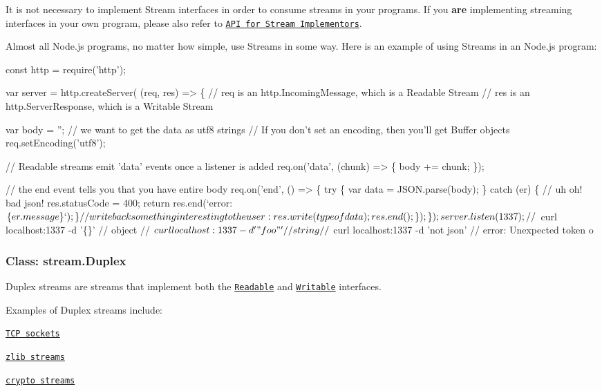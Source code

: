 It is not necessary to implement Stream interfaces in order to consume streams in your programs. If you {\bfseries are} implementing streaming interfaces in your own program, please also refer to \href{#stream_api_for_stream_implementors}{\tt A\+PI for Stream Implementors}.

Almost all Node.\+js programs, no matter how simple, use Streams in some way. Here is an example of using Streams in an Node.\+js program\+:


\begin{DoxyCode}
const http = require('http');

var server = http.createServer( (req, res) => \{
  // req is an http.IncomingMessage, which is a Readable Stream
  // res is an http.ServerResponse, which is a Writable Stream

  var body = '';
  // we want to get the data as utf8 strings
  // If you don't set an encoding, then you'll get Buffer objects
  req.setEncoding('utf8');

  // Readable streams emit 'data' events once a listener is added
  req.on('data', (chunk) => \{
    body += chunk;
  \});

  // the end event tells you that you have entire body
  req.on('end', () => \{
    try \{
      var data = JSON.parse(body);
    \} catch (er) \{
      // uh oh!  bad json!
      res.statusCode = 400;
      return res.end(`error: $\{er.message\}`);
    \}

    // write back something interesting to the user:
    res.write(typeof data);
    res.end();
  \});
\});

server.listen(1337);

// $ curl localhost:1337 -d '\{\}'
// object
// $ curl localhost:1337 -d '"foo"'
// string
// $ curl localhost:1337 -d 'not json'
// error: Unexpected token o
\end{DoxyCode}


\subsubsection*{Class\+: stream.\+Duplex}

Duplex streams are streams that implement both the \href{#stream_class_stream_readable}{\tt Readable} and \href{#stream_class_stream_writable}{\tt Writable} interfaces.

Examples of Duplex streams include\+:


\begin{DoxyItemize}
\item \href{https://nodejs.org/docs/v5.8.0/api/net.html#net_class_net_socket}{\tt T\+CP sockets}
\item \href{zlib.html}{\tt zlib streams}
\item \href{crypto.html}{\tt crypto streams}
\end{DoxyItemize}

